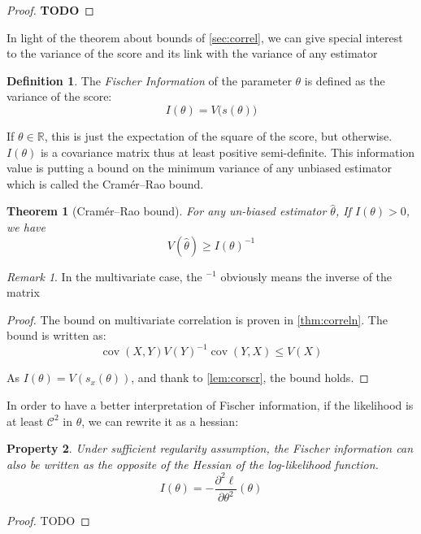 \documentclass[10pt]{report}
\theoremstyle{plain}
\newtheorem{thm}{Theorem}[chapter]
\newtheorem{prop}[thm]{Property}
\theoremstyle{definition}
\newtheorem{defn}{Definition}[chapter]
\theoremstyle{remark}
\newtheorem*{rem}{Remark}
\newcommand{\R}{\ensuremath{\mathbb{R}}}
\newcommand{\TODO}{\textbf{TODO}}
\renewcommand{\leq}{\leqslant}
\DeclareMathOperator{\cov}{cov}
\newcommand{\class}[1]{{\mathscr{C}^{#1}}}
\begin{document}
\begin{proof}
  \TODO{}
\end{proof}

In light of the theorem about bounds of \cref{sec:correl}, we can give special
interest to the variance of the score and its link with the variance of any estimator

\begin{defn} The \emph{Fischer Information} of the parameter $\theta$ is defined
  as the variance of the score:
  \[I(\theta) = V\big(s(\theta)\big)\]
\end{defn}

If $\theta \in \R$, this is just the expectation of the square of the score, but
otherwise. $I(\theta)$ is a covariance matrix thus at least positive
semi-definite.
This information value is putting a bound on the minimum variance of any
unbiased estimator which is called the Cramér–Rao bound.

\begin{thm}[Cramér–Rao bound]
  For any un-biased estimator $\hat \theta$, If $I(\theta) > 0$, we have
  \[V(\hat{\theta}) \ge {I(\theta)}^{-1}\]
\end{thm}

\begin{rem}
  In the multivariate case, the ${}^{-1}$ obviously means the inverse of the matrix
\end{rem}

\begin{proof}
  The bound on multivariate correlation is proven in \cref{thm:correln}. The
  bound is written as:
  \[\cov(X,Y){V(Y)}^{-1}\cov(Y,X) \leq V(X)\]

  As $I(\theta) = V(s_x(\theta))$, and thank to \cref{lem:corscr}, the bound holds.
\end{proof}

In order to have a better interpretation of Fischer information, if the
likelihood is at least $\class 2$ in $\theta$, we can rewrite
it as a hessian:

\begin{prop}\label{prop:fisherhessian}
  Under sufficient regularity assumption,
  the Fischer information can also be written as the opposite of the Hessian of the
  log-likelihood function.
  \[I(\theta) = -\frac{\partial^2 \ell}{\partial \theta^2}(\theta)\]
\end{prop}

\begin{proof}
  TODO
\end{proof}
\end{document}
